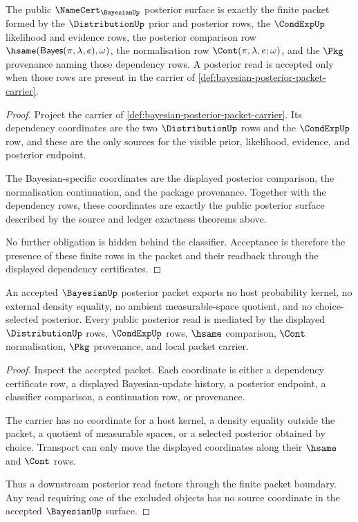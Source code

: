 \begin{theorem}
\label{thm:bayesian-posterior-namecert-obligation-surface}
The public $\NameCert_{\BayesianUp}$ posterior surface is exactly the finite packet formed by the $\DistributionUp$ prior and posterior rows, the $\CondExpUp$ likelihood and evidence rows, the posterior comparison row $\hsame(\mathsf{Bayes}(\pi,\lambda,e),\omega)$, the normalisation row $\Cont(\pi,\lambda,e;\omega)$, and the $\Pkg$ provenance naming those dependency rows. A posterior read is accepted only when those rows are present in the carrier of \autoref{def:bayesian-posterior-packet-carrier}.
\end{theorem}
\begin{proof}
Project the carrier of \autoref{def:bayesian-posterior-packet-carrier}. Its dependency coordinates are the two $\DistributionUp$ rows and the $\CondExpUp$ row, and these are the only sources for the visible prior, likelihood, evidence, and posterior endpoint.

The Bayesian-specific coordinates are the displayed posterior comparison, the normalisation continuation, and the package provenance. Together with the dependency rows, these coordinates are exactly the public posterior surface described by the source and ledger exactness theorems above.

No further obligation is hidden behind the classifier. Acceptance is therefore the presence of these finite rows in the packet and their readback through the displayed dependency certificates.
\end{proof}

\begin{theorem}
\label{thm:bayesian-posterior-non-escape-boundary}
An accepted $\BayesianUp$ posterior packet exports no host probability kernel, no external density equality, no ambient measurable-space quotient, and no choice-selected posterior. Every public posterior read is mediated by the displayed $\DistributionUp$ rows, $\CondExpUp$ rows, $\hsame$ comparison, $\Cont$ normalisation, $\Pkg$ provenance, and local packet carrier.
\end{theorem}
\begin{proof}
Inspect the accepted packet. Each coordinate is either a dependency certificate row, a displayed Bayesian-update history, a posterior endpoint, a classifier comparison, a continuation row, or provenance.

The carrier has no coordinate for a host kernel, a density equality outside the packet, a quotient of measurable spaces, or a selected posterior obtained by choice. Transport can only move the displayed coordinates along their $\hsame$ and $\Cont$ rows.

Thus a downstream posterior read factors through the finite packet boundary. Any read requiring one of the excluded objects has no source coordinate in the accepted $\BayesianUp$ surface.
\end{proof}

